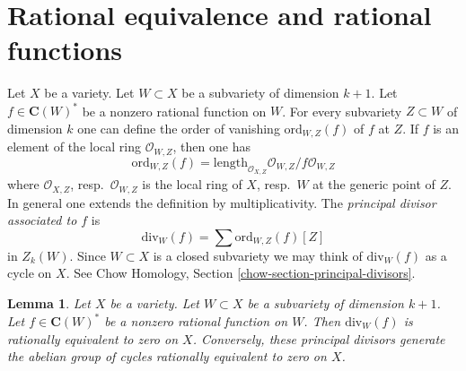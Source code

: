 \documentclass{stacks-project}
\theoremstyle{plain}
\newtheorem{lemma}[subsection]{Lemma}
\theoremstyle{definition}
\theoremstyle{remark}
\numberwithin{equation}{subsection}
\begin{document}
\section{Rational equivalence and rational functions}
\label{section-alternative}

\noindent
Let $X$ be a variety. Let $W \subset X$ be a subvariety
of dimension $k + 1$. Let $f \in \mathbf{C}(W)^*$ be a nonzero rational
function on $W$. For every subvariety $Z \subset W$ of dimension $k$
one can define the order of vanishing $\text{ord}_{W, Z}(f)$ of $f$ at
$Z$. If $f$ is an element of the local ring $\mathcal{O}_{W, Z}$,
then one has
$$
\text{ord}_{W, Z}(f) =
\text{length}_{\mathcal{O}_{X, Z}} \mathcal{O}_{W, Z}/f\mathcal{O}_{W, Z}
$$
where $\mathcal{O}_{X, Z}$, resp.\ $\mathcal{O}_{W, Z}$ is the
local ring of $X$, resp.\ $W$ at the generic point of $Z$. In general one
extends the definition by multiplicativity. The {\it principal divisor
associated to $f$} is
$$
\text{div}_W(f) = \sum \text{ord}_{W, Z}(f)[Z]
$$
in $Z_k(W)$. Since $W \subset X$ is a closed subvariety we may think
of $\text{div}_W(f)$ as a cycle on $X$.
See Chow Homology, Section \ref{chow-section-principal-divisors}.

\begin{lemma}
\label{lemma-rational-equivalence}
Let $X$ be a variety. Let $W \subset X$ be a subvariety
of dimension $k + 1$. Let $f \in \mathbf{C}(W)^*$ be a nonzero rational
function on $W$. Then $\text{div}_W(f)$ is rationally equivalent to zero on
$X$. Conversely, these principal divisors generate the abelian group of
cycles rationally equivalent to zero on $X$.
\end{lemma}
\end{document}
